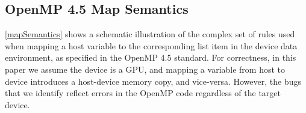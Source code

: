 % 
\subsection{OpenMP 4.5 Map Semantics}
\autoref{mapSemantics} shows a schematic illustration 
of the complex set of rules used when mapping 
a host variable to the corresponding list item 
in the device data environment, as specified 
in the OpenMP 4.5 standard. For correctness, in this paper 
we assume the device is a GPU, and mapping 
a variable from host to device introduces a host-device memory copy, 
and vice-versa. 
However, the bugs that we identify reflect errors in the OpenMP 
code regardless of the target device. 

